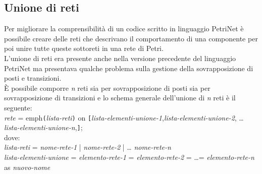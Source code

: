 \documentclass[italian,12pt]{book}
\begin{document}
\subsection{Unione di reti}\label{subsect:unione_di_reti}
Per migliorare la comprensibilità di un codice scritto in linguaggio PetriNet è possibile creare delle reti che descrivano il comportamento di una componente per poi unire tutte queste sottoreti in una rete di Petri.\\
L'unione di reti era presente anche nella versione precedente del linguaggio PetriNet ma presentava qualche problema sulla gestione della sovrapposizione di posti e transizioni.\\
È possibile comporre \emph{n} reti sia per sovrapposizione di posti sia per sovrapposizione di transizioni e lo schema generale dell'unione di \emph{n} reti è il seguente:\\

\emph{rete}  = emph{\tt(}\emph{lista-reti}{\tt)} on
{\tt[}\emph{lista-elementi-unione-1},\emph{lista-elementi-unione-2},
\dots \emph{lista-elementi-unione-n},{\tt]};\\

dove:\\

\emph{lista-reti} = \emph{nome-rete-1} | \emph{nome-rete-2} | \dots
\emph{nome-rete-n} \\

\emph{lista-elementi-unione} = \emph{elemento-rete-1} =
\emph{elemento-rete-2} = \dots = \emph{elemento-rete-n} as
\emph{nuovo-nome} \\
\end{document}
